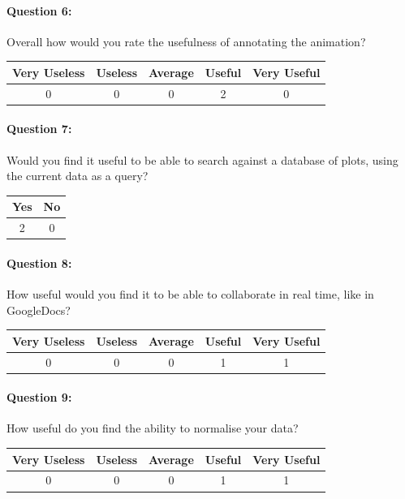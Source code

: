 \paragraph*{Question 6: } Overall how would you rate the usefulness of annotating the animation?

\begin{center}
\begin{tabular}{ | c | c | c | c | c |}
    \hline
    Very Useless & Useless  & Average & Useful & Very Useful \\
    \hline
    0 & 0 & 0 & 2 & 0 \\
    \hline
\end{tabular}
\end{center}

\paragraph*{Question 7: } Would you find it useful to be able to search against a database of plots, using the current data as a query?

\begin{center}
\begin{tabular}{ | c | c |}
    \hline
    Yes & No\\
    \hline
    2 & 0 \\
    \hline
\end{tabular}
\end{center}

\paragraph*{Question 8: } How useful would you find it to be able to collaborate in real time, like in GoogleDocs?
\begin{center}
\begin{tabular}{ | c | c | c | c | c |}
    \hline
    Very Useless & Useless  & Average & Useful & Very Useful \\
    \hline
    0 & 0 & 0 & 1 & 1 \\
    \hline
\end{tabular}
\end{center}

\paragraph*{Question 9: } How useful do you find the ability to normalise your data?
\begin{center}
\begin{tabular}{ | c | c | c | c | c |}
    \hline
    Very Useless & Useless  & Average & Useful & Very Useful \\
    \hline
    0 & 0 & 0 & 1 & 1 \\
    \hline
\end{tabular}
\end{center}


